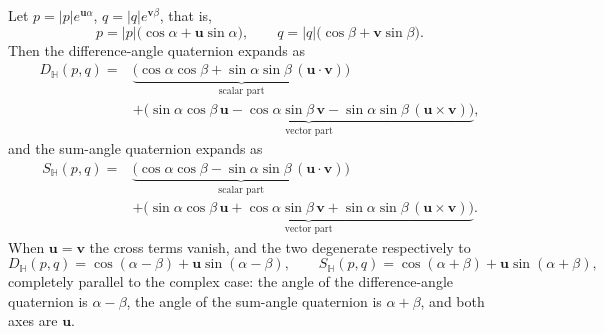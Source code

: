 \begin{lemma}\label{lem:quaternion_diff_sum_decomposition}
Let $p=|p|e^{\mathbf u\alpha}$, $q=|q|e^{\mathbf v\beta}$, that is,
\[
p=|p|\bigl(\cos\alpha+\mathbf u\sin\alpha\bigr),\qquad
q=|q|\bigl(\cos\beta+\mathbf v\sin\beta\bigr).
\]
Then the difference-angle quaternion expands as
\[
\begin{aligned}
D_{\mathbb H}(p,q)
={}& \underbrace{\bigl(\cos\alpha\cos\beta+\sin\alpha\sin\beta\,(\mathbf u\cdot\mathbf v)\bigr)}_{\text{scalar part}} \\
&+ \underbrace{\bigl(\sin\alpha\cos\beta\,\mathbf u-\cos\alpha\sin\beta\,\mathbf v
   -\sin\alpha\sin\beta\,(\mathbf u\times\mathbf v)\bigr)}_{\text{vector part}},
\end{aligned}
\]
and the sum-angle quaternion expands as
\[
\begin{aligned}
S_{\mathbb H}(p,q)
={}& \underbrace{\bigl(\cos\alpha\cos\beta-\sin\alpha\sin\beta\,(\mathbf u\cdot\mathbf v)\bigr)}_{\text{scalar part}} \\
&+ \underbrace{\bigl(\sin\alpha\cos\beta\,\mathbf u+\cos\alpha\sin\beta\,\mathbf v
   +\sin\alpha\sin\beta\,(\mathbf u\times\mathbf v)\bigr)}_{\text{vector part}}.
\end{aligned}
\]
When $\mathbf u=\mathbf v$ the cross terms vanish, and the two degenerate respectively to
\[
D_{\mathbb H}(p,q)=\cos(\alpha-\beta)+\mathbf u\sin(\alpha-\beta),\qquad
S_{\mathbb H}(p,q)=\cos(\alpha+\beta)+\mathbf u\sin(\alpha+\beta),
\]
completely parallel to the complex case: the angle of the difference-angle quaternion is $\alpha-\beta$, the angle of the sum-angle quaternion is $\alpha+\beta$, and both axes are $\mathbf u$.
\end{lemma}

